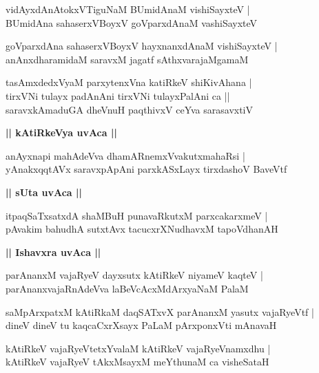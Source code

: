 \documentclass[twoside,12pt,openright]{book}
\newcounter{shloka}[chapter]
\def\uvaca#1{\centerline{{\large\textbf{#1}}}}
\begin{document}
\begin{shloka}%
vidAyxdAnAtokxVTiguNaM BUmidAnaM vishiSayxteV |\\
BUmidAna sahaserxVBoyxV goVparxdAnaM vashiSayxteV 
\end{shloka}

\begin{shloka}%
goVparxdAna sahaserxVBoyxV hayxnanxdAnaM vishiSayxteV |\\
anAnxdharamidaM saravxM jagatf sAthxvarajaMgamaM 
\end{shloka}

\begin{shloka}%
tasAmxdedxVyaM parxytenxVna katiRkeV shiKivAhana |\\
tirxVNi tulayx padAnAni tirxVNi tulayxPalAni ca ||\\
saravxkAmaduGA dheVnuH paqthivxV ceYva sarasavxtiV 
\end{shloka}

\uvaca{|| kAtiRkeVya uvAca ||}

\begin{shloka}%
anAyxnapi mahAdeVva dhamARnemxVvakutxmahaRsi |\\
yAnakxqqtAVx saravxpApAni parxkASxLayx tirxdashoV BaveVtf
\end{shloka}

\uvaca{|| sUta uvAca ||}

\begin{shloka}%
itpaqSaTxsatxdA shaMBuH punavaRkutxM parxcakarxmeV |\\
pAvakim bahudhA sutxtAvx tacucxrXNudhavxM tapoVdhanAH 
\end{shloka}

\uvaca{|| Ishavxra uvAca ||}

\begin{shloka}%
parAnanxM vajaRyeV dayxsutx kAtiRkeV niyameV kaqteV |\\
parAnanxvajaRnAdeVva laBeVcAcxMdArxyaNaM PalaM
\end{shloka}

\begin{shloka}%
saMpArxpatxM kAtiRkaM daqSATxvX parAnanxM yasutx vajaRyeVtf |\\
dineV dineV tu kaqcaCxrXsayx PaLaM pArxponxVti mAnavaH 
\end{shloka}

\begin{shloka}%
kAtiRkeV vajaRyeVtetxYvalaM kAtiRkeV vajaRyeVnamxdhu |\\
kAtiRkeV vajaRyeV tAkxMsayxM meYthunaM ca visheSataH 
\end{shloka}
\end{document}
